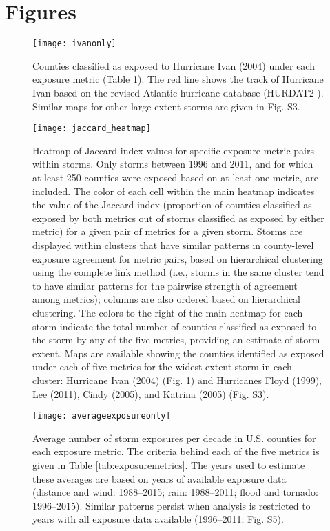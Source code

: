 \section*{Figures}

\listoffigures

\clearpage

\begin{figure}%
\centering
\texttt{[image: ivanonly]}
\caption{Counties classified as exposed to Hurricane Ivan (2004) under each
exposure metric (Table 1). The red line shows the track of Hurricane Ivan 
based on the revised Atlantic hurricane database (HURDAT2 \cite{landsea2013}).
Similar maps for other large-extent storms are given in Fig. S3.}
\label{fig:ivanexposure} 
\end{figure}

\clearpage

\begin{figure}%
\centering 
\texttt{[image: jaccard\_heatmap]} 
\caption{Heatmap of Jaccard index values for
specific exposure metric pairs within storms. Only storms between 1996 and 2011,
and for which at least 250 counties were exposed based on at least one metric,
are included. The color of each cell within the main heatmap indicates the value
of the Jaccard index (proportion of counties classified as exposed by both
metrics out of storms classified as exposed by either metric) for a given pair
of metrics for a given storm. Storms are displayed within clusters that have
similar patterns in county-level exposure agreement for metric pairs, based on
hierarchical clustering using the complete link method
\cite{murtagh2012algorithms} (i.e., storms in the same cluster tend to have
similar patterns for the pairwise strength of agreement among metrics); columns
are also ordered based on hierarchical clustering. The colors to the right of
the main heatmap for each storm indicate the total number of counties classified
as exposed to the storm by any of the five metrics, providing an estimate of
storm extent. Maps are available showing the counties identified as exposed
under each of five metrics for the widest-extent storm in each cluster:
Hurricane Ivan (2004) (Fig. \ref{fig:ivanexposure}) and Hurricanes Floyd (1999),
Lee (2011), Cindy (2005), and Katrina (2005) (Fig. S3).} 
\label{fig:jaccard}
\end{figure}

\clearpage

\begin{figure}%
\centering
\texttt{[image: averageexposureonly]} 
\caption{Average number of storm exposures per decade in U.S. counties for 
each exposure metric. The criteria behind each of the five metrics is given 
in Table \ref{tab:exposuremetrics}. The years used to estimate these averages 
are based on years of available exposure data (distance and wind: 1988--2015; 
rain: 1988--2011; flood and tornado: 1996--2015). Similar patterns persist when
analysis is restricted to years with all exposure data available (1996--2011;
Fig. S5).} 
\label{fig:averageexposure} 
\end{figure}